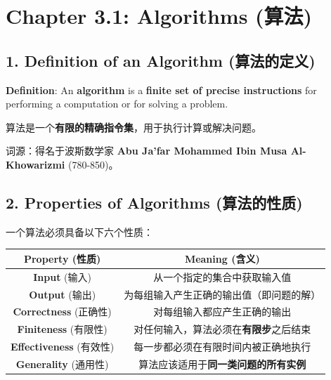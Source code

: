 \documentclass[10pt,a4paper,openany]{ctexbook}
\theoremstyle{definition}
\theoremstyle{remark}
\renewenvironment{quote}
  {\list{}{\leftmargin=1em\rightmargin=0pt\topsep=0.5pt\partopsep=0pt}\item[]}
  {\endlist}
\begin{document}
\section{Chapter 3.1: Algorithms (算法)}

\vspace{-2pt}

\subsection{1. Definition of an Algorithm (算法的定义)}

\begin{quote}
\textbf{Definition}: An \textbf{algorithm} is a \textbf{finite set of precise instructions} for performing a computation or for solving a problem.

算法是一个\textbf{有限的精确指令集}，用于执行计算或解决问题。

词源：得名于波斯数学家 \textbf{Abu Ja'far Mohammed Ibin Musa Al-Khowarizmi} (780-850)。

\end{quote}
\vspace{-2pt}

\subsection{2. Properties of Algorithms (算法的性质)}

一个算法必须具备以下六个性质：
\begin{center}
\begin{tabular}{cc}
\hline
Property (性质) & Meaning (含义) \\ \hline
\textbf{Input} (输入) & 从一个指定的集合中获取输入值 \\
\textbf{Output} (输出) & 为每组输入产生正确的输出值（即问题的解） \\
\textbf{Correctness} (正确性) & 对每组输入都应产生正确的输出 \\
\textbf{Finiteness} (有限性) & 对任何输入，算法必须在\textbf{有限步}之后结束 \\
\textbf{Effectiveness} (有效性) & 每一步都必须在有限时间内被正确地执行 \\
\textbf{Generality} (通用性) & 算法应该适用于\textbf{同一类问题的所有实例} \\
\hline
\end{tabular}

\end{center}

\vspace{-2pt}
\end{document}
